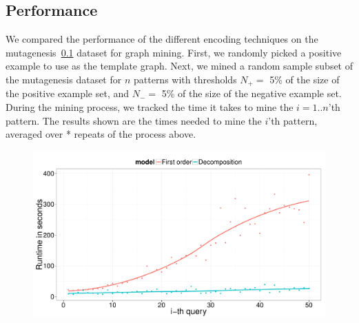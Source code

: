\subsection{Performance}
We compared the performance of the different encoding techniques on the mutagenesis~\ref{} dataset for graph mining.
First, we randomly picked a positive example to use as the template graph.
Next, we mined a random sample subset of the mutagenesis dataset for $n$ patterns with thresholds $N_{+} = $ 5\% of the size of the positive example set, and $N_{-} =$ 5\% of the size of the negative example set.
During the mining process, we tracked the time it takes to mine the $i=1..n$'th pattern.
The results shown are the times needed to mine the $i$'th pattern, averaged over * repeats of the process above.

\begin{figure}
\includegraphics[width=\linewidth]{extra/figure_comparison_yoshida.pdf}
\end{figure}
